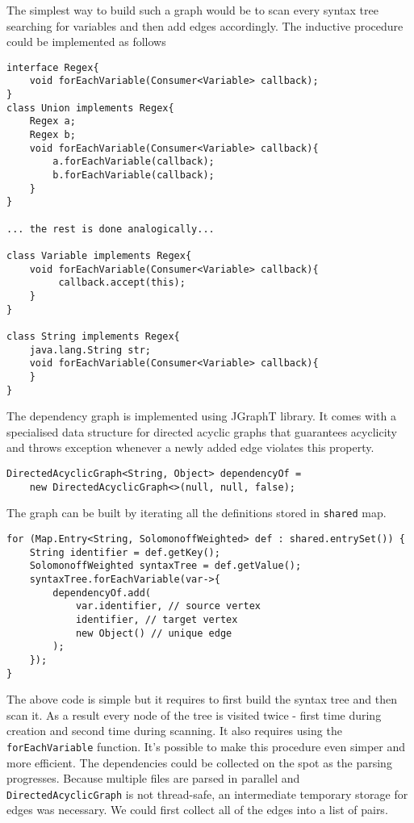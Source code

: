 The simplest way to build such a graph would be to scan every syntax tree searching for variables and then add edges accordingly. The inductive procedure could be implemented as follows
\begin{lstlisting}
interface Regex{
    void forEachVariable(Consumer<Variable> callback);
}
class Union implements Regex{
    Regex a; 
    Regex b;
    void forEachVariable(Consumer<Variable> callback){
        a.forEachVariable(callback);
        b.forEachVariable(callback);
    }
}

... the rest is done analogically...

class Variable implements Regex{
    void forEachVariable(Consumer<Variable> callback){
         callback.accept(this);
    }
}

class String implements Regex{
    java.lang.String str;
    void forEachVariable(Consumer<Variable> callback){
    }
}
\end{lstlisting}
The dependency graph is implemented using JGraphT library. It comes with a specialised data structure for directed acyclic graphs that guarantees acyclicity and throws exception whenever a newly added edge violates this property.
\begin{lstlisting}
DirectedAcyclicGraph<String, Object> dependencyOf =
    new DirectedAcyclicGraph<>(null, null, false);
\end{lstlisting}
The graph can be built by iterating all the definitions stored in \texttt{shared} map.
\begin{lstlisting}
for (Map.Entry<String, SolomonoffWeighted> def : shared.entrySet()) {
    String identifier = def.getKey();
    SolomonoffWeighted syntaxTree = def.getValue();
    syntaxTree.forEachVariable(var->{
        dependencyOf.add(
            var.identifier, // source vertex
            identifier, // target vertex
            new Object() // unique edge
        );
    });
}
\end{lstlisting}
The above code is simple but it requires to first build the syntax tree and then scan it. As a result every node of the tree is visited twice - first time during creation and second time during scanning. It also requires using the 
\texttt{forEachVariable} function. It's possible to make this procedure even simper and more efficient. The dependencies could be collected on the spot as the parsing progresses. Because multiple files are parsed in parallel
and \texttt{DirectedAcyclicGraph} is not thread-safe, an intermediate temporary storage for edges was necessary. We could first collect all of the edges into a list of pairs.
